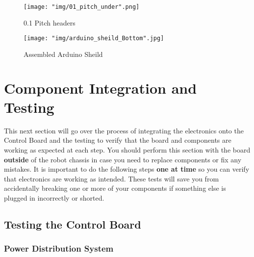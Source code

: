 \documentclass[12pt]{article}
\begin{document}
\begin{enumerate}
\begin{figure}[H]
	\centering
	\texttt{[image: "img/01\_pitch\_under".png]}
	\caption{0.1 Pitch headers}
\end{figure}

\begin{figure}[H]
  \centering
  \begin{minipage}[b]{0.75\textwidth}
    \texttt{[image: "img/arduino\_sheild\_Bottom".jpg]}
  \end{minipage}
  \caption{Assembled Arduino Sheild}
  \label{assembled_arduino_sheild_bottom}
\end{figure}

\end{enumerate}

\section{Component Integration and Testing}

This next section will go over the process of integrating the electronics onto the Control Board and the testing to verify that the board and components are working as expected at each step. You should perform this section with the board \textbf{outside} of the robot chassis in case you need to replace components or fix any mistakes. It is important to do the following steps \textbf{one at time} so you can verify that electronics are working as intended. These tests will save you from accidentally breaking one or more of your components if something else is plugged in incorrectly or shorted.

\subsection{Testing the Control Board}
\subsubsection{Power Distribution System}
\end{document}
